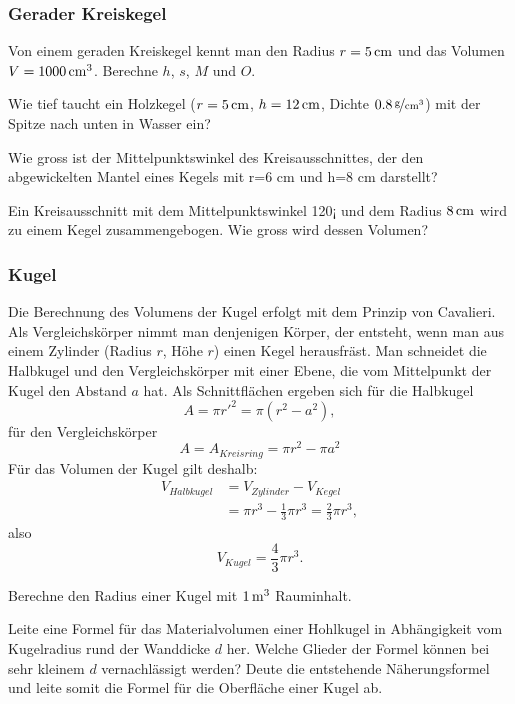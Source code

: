 \documentclass[%
11pt,%
twoside,%
titlepage,%
a4page,%
german,%
headsepline%
]{scrartcl}
\begin{document}
\subsubsection{Gerader Kreiskegel}
\begin{ueb}
Von einem geraden Kreiskegel kennt man den Radius $r=\unit[5]{cm}$ und das Volumen $V=\unit[1000]{cm^3}$. Berechne $h$, $s$, $M$ und $O$.
\end{ueb}

\begin{ueb}
Wie tief taucht ein Holzkegel ($r=\unit[5]{cm}$, $h=\unit[12]{cm}$, Dichte $\unitfrac[0.8]{g}{cm^3}$) mit der Spitze nach unten in Wasser ein?
\end{ueb}

\begin{ueb}
Wie gross ist der Mittelpunktswinkel des Kreisausschnittes, der den abgewickelten Mantel eines Kegels mit r=6 cm und h=8 cm darstellt?
\end{ueb}

\begin{ueb}
Ein Kreisausschnitt mit dem Mittelpunktswinkel 120¡ und dem Radius $\unit[8]{cm}$ wird zu einem Kegel zusammengebogen. Wie gross wird dessen Volumen?
\end{ueb}

\subsubsection{Kugel}
Die Berechnung des Volumens der Kugel erfolgt mit dem Prinzip von Cavalieri. Als Vergleichsk\"orper nimmt man denjenigen K\"orper, der entsteht, wenn man aus einem Zylinder (Radius $r$, H\"ohe $r$) einen Kegel herausfr\"ast.
Man schneidet die Halbkugel und den Vergleichsk\"orper mit einer Ebene, die vom Mittelpunkt der Kugel den Abstand $a$ hat. Als Schnittfl\"achen ergeben sich
f\"ur die Halbkugel
$$A = \pi r'^2 =\pi(r^2 - a^2),$$
f\"ur den Vergleichsk\"orper
$$A =A_{Kreisring} =\pi r^2-\pi a^2$$
F\"ur das Volumen der Kugel gilt deshalb:
\begin{align*}
V_{Halbkugel}&=V_{Zylinder}-V_{Kegel}\\
&=\pi r^3-\frac{1}{3}\pi r^3=\frac{2}{3}\pi r^3,
\end{align*}
also
$$V_{Kugel}=\frac{4}{3}\pi r^3.$$

\begin{ueb}
Berechne den Radius einer Kugel mit $\unit[1]{m^3}$ Rauminhalt.
\end{ueb}

\begin{ueb}
Leite eine Formel f\"ur das Materialvolumen einer Hohlkugel in Abh\"angigkeit vom Kugelradius rund der Wanddicke $d$ her. Welche Glieder der Formel k\"onnen bei sehr kleinem $d$ vernachl\"assigt werden? Deute die entstehende N\"aherungsformel und leite somit die Formel f\"ur die Oberfl\"ache einer Kugel ab.
\end{ueb}
\end{document}
